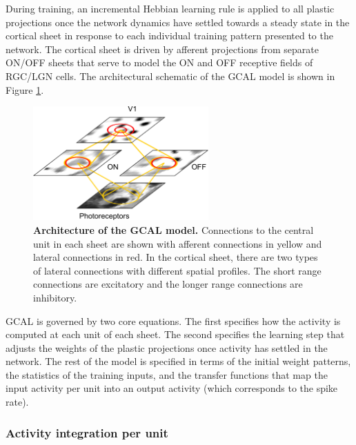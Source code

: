 \documentclass[phd,ianc,twoside]{infthesis}
\begin{document}
During training, an incremental Hebbian learning rule is applied to all
plastic projections once the network dynamics have settled towards a steady state in the cortical
sheet in response to each individual training pattern presented to the
network. The cortical sheet is driven by afferent projections from
separate ON/OFF sheets that serve to model the ON and OFF receptive
fields of RGC/LGN cells. The architectural schematic of the GCAL model
is shown in Figure \ref{fig:GCAL_schematic}.

\begin{figure}
\center
\includegraphics[width=0.6\textwidth]{./figures/GCAL_schematic.pdf}
\caption{{\bf Architecture of the GCAL model.} Connections to the central unit
  in each sheet are shown with afferent connections in yellow and
  lateral connections in red. In the cortical sheet, there are two types of lateral connections with different spatial profiles. The short range connections are excitatory and the longer range connections are inhibitory.}
  \label{fig:GCAL_schematic}
\end{figure}

GCAL is governed by two core equations.  The first specifies how the
activity is computed at each unit of each sheet. The second specifies
the learning step
that adjusts the weights of the plastic projections once activity has
settled in the network. The rest of the model is specified in terms of
the initial weight patterns, the statistics of the training inputs, and
the transfer functions that map the input activity per unit into an
output activity (which corresponds to the spike rate).


\subsubsection*{Activity integration per unit}
\end{document}
